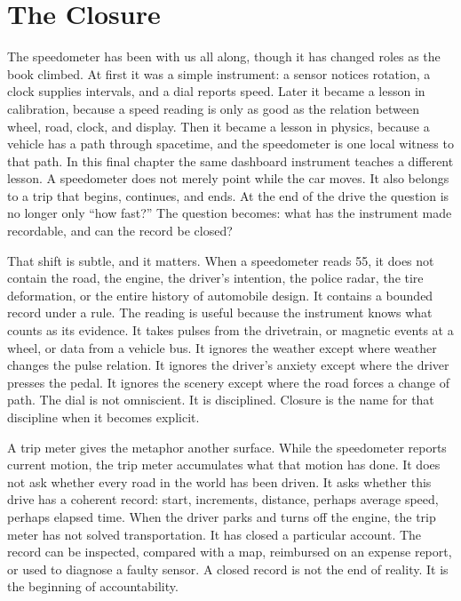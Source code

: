 \chapter{The Closure}
\label{chap:the-closure}

The speedometer has been with us all along, though it has changed roles as the
book climbed. At first it was a simple instrument: a sensor notices rotation, a
clock supplies intervals, and a dial reports speed. Later it became a lesson in
calibration, because a speed reading is only as good as the relation between
wheel, road, clock, and display. Then it became a lesson in physics, because a
vehicle has a path through spacetime, and the speedometer is one local witness
to that path. In this final chapter the same dashboard instrument teaches a
different lesson. A speedometer does not merely point while the car moves. It
also belongs to a trip that begins, continues, and ends. At the end of the
drive the question is no longer only ``how fast?'' The question becomes: what
has the instrument made recordable, and can the record be closed?

That shift is subtle, and it matters. When a speedometer reads 55, it does not
contain the road, the engine, the driver's intention, the police radar, the
tire deformation, or the entire history of automobile design. It contains a
bounded record under a rule. The reading is useful because the instrument knows
what counts as its evidence. It takes pulses from the drivetrain, or magnetic
events at a wheel, or data from a vehicle bus. It ignores the weather except
where weather changes the pulse relation. It ignores the driver's anxiety
except where the driver presses the pedal. It ignores the scenery except where
the road forces a change of path. The dial is not omniscient. It is disciplined.
Closure is the name for that discipline when it becomes explicit.

A trip meter gives the metaphor another surface. While the speedometer reports
current motion, the trip meter accumulates what that motion has done. It does
not ask whether every road in the world has been driven. It asks whether this
drive has a coherent record: start, increments, distance, perhaps average speed,
perhaps elapsed time. When the driver parks and turns off the engine, the trip
meter has not solved transportation. It has closed a particular account. The
record can be inspected, compared with a map, reimbursed on an expense report,
or used to diagnose a faulty sensor. A closed record is not the end of reality.
It is the beginning of accountability.

